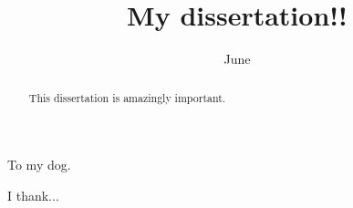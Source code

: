 \documentclass[12pt, pdftex]{cmu_ece_dissertation}
\begin{document}
 

\frontmatter

\pagestyle{empty}

\title{\bf \textsf{My dissertation!!}}
\author{}
\date{June}


\support{}
\disclaimer{}


\keywords{}
\maketitle

\begin{dedication}
To my dog.
\end{dedication}

\begin{keywordspage}
\end{keywordspage}
\pagestyle{plain} %


\begin{abstract}
This dissertation is amazingly important.
\end{abstract}

\begin{acknowledgments}
I thank...
\end{acknowledgments}

\tableofcontents
\listoffigures
\listoftables

\mainmatter


%
%
%
%
%
\end{document}

